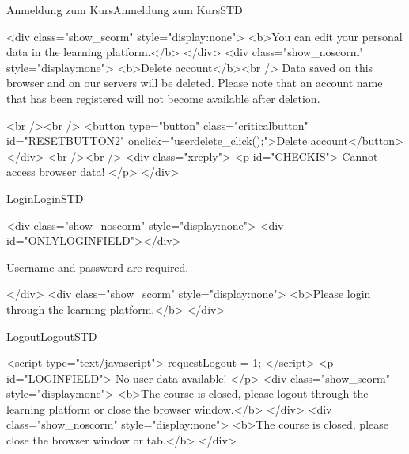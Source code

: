 \begin{MXContent}{Anmeldung zum Kurs}{Anmeldung zum Kurs}{STD}




\begin{html}
<div class="show_scorm" style="display:none">
<b>You can edit your personal data in the learning platform.</b>
</div>
<div class="show_noscorm" style="display:none">
<b>Delete account</b><br />
Data saved on this browser and on our servers will be deleted. Please note that
an account name that has been registered will not become available after
deletion.

<br /><br />
<button type="button" class="criticalbutton" id="RESETBUTTON2"
onclick="userdelete_click();">Delete account</button> </div>
<br /><br />
<div class="xreply">
<p id="CHECKIS">
Cannot access browser data!
</p>
</div>
\end{html}
\end{MXContent}

\begin{MXContent}{Login}{Login}{STD}
\MGlobalLoginTag
{}
\begin{html}
<div class="show_noscorm" style="display:none">
<div id="ONLYLOGINFIELD"></div>
\end{html}

Username and password are required.

\begin{html}
</div>
<div class="show_scorm" style="display:none">
<b>Please login through the learning platform.</b>
</div>
\end{html}

\end{MXContent}


\begin{MXContent}{Logout}{Logout}{STD}
\MGlobalLogoutTag
{}

\begin{html}
<script type="text/javascript">
requestLogout = 1;
</script>
<p id="LOGINFIELD">
No user data available!
</p>
<div class="show_scorm" style="display:none">
<b>The course is closed, please logout through the learning platform or
close the browser window.</b> </div>
<div class="show_noscorm" style="display:none">
<b>The course is closed, please close the browser window or tab.</b>
</div>
\end{html}

\end{MXContent}


